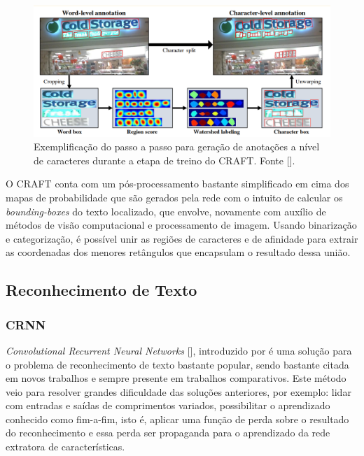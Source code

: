 \begin{figure}
    \centering
    \includegraphics[width=\textwidth]{figs/craft-char-level-annotation.png}
    \caption{Exemplificação do passo a passo para geração de anotações a nível de caracteres durante a etapa de treino do CRAFT. Fonte [].}
    \label{fig:craft_char_level_annotation}
\end{figure}

O CRAFT conta com um pós-processamento bastante simplificado em cima dos mapas de probabilidade que são gerados pela rede com o intuito de calcular os \textit{bounding-boxes} do texto localizado, que envolve, novamente com auxílio de métodos de visão computacional e processamento de imagem. Usando binarização e categorização, é possível unir as regiões de caracteres e de afinidade para extrair as coordenadas dos menores retângulos que encapsulam o resultado dessa união.


\subsection{Reconhecimento de Texto}
\lipsum[25]


\subsubsection{CRNN} \label{crnn}
\textit{Convolutional Recurrent Neural Networks} [], introduzido por \citeauthor{CRNN} é uma solução para o problema de reconhecimento de texto bastante popular, sendo bastante citada em novos trabalhos e sempre presente em trabalhos comparativos. Este método veio para resolver grandes dificuldade das soluções anteriores, por exemplo: lidar com entradas e saídas de comprimentos variados, possibilitar o aprendizado conhecido como fim-a-fim, isto é, aplicar uma função de perda sobre o resultado do reconhecimento e essa perda ser propaganda para o aprendizado da rede extratora de características.

